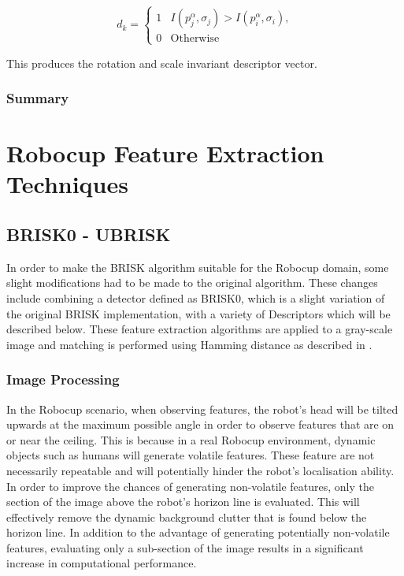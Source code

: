 \documentclass[11pt]{report}
\begin{document}
\begin{equation}
d_k = \left\{ \begin{array}{rl}
1 &\mbox{$I(p_j^{\alpha}, \sigma_j) > I(p_i^{\alpha}, \sigma_i)$,} \\
0 &\mbox{Otherwise}
\end{array} \right.
\label{eqn:brightness}
\end{equation}

This produces the rotation and scale invariant descriptor vector.\\

\subsection{Summary}
\label{sec:summary1} 

\chapter{Robocup Feature Extraction Techniques}
\label{sec:realtimeFeatureExtraction}

\section{BRISK0 - UBRISK}
\label{sec:brisk0}
In order to make the BRISK algorithm suitable for the Robocup domain, some slight modifications had to be made to the original algorithm. These changes include combining a detector defined as BRISK0, which is a slight variation of the original BRISK implementation, with a variety of Descriptors which will be described below. These feature extraction algorithms are applied to a gray-scale image and matching is performed using Hamming distance as described in .\\

\subsection{Image Processing}
\label{sec:imageProcessingBrisk}
In the Robocup scenario, when observing features, the robot's head will be tilted upwards at the maximum possible angle in order to observe features that are on or near the ceiling. This is because in a real Robocup environment, dynamic objects such as humans will generate volatile features. These feature are not necessarily repeatable and will potentially hinder the robot's localisation ability.\\

In order to improve the chances of generating non-volatile features, only the section of the image above the robot's horizon line is evaluated. This will effectively remove the dynamic background clutter that is found below the horizon line. In addition to the advantage of generating potentially non-volatile features, evaluating only a sub-section of the image results in a significant increase in computational performance. \\ 
\end{document}
